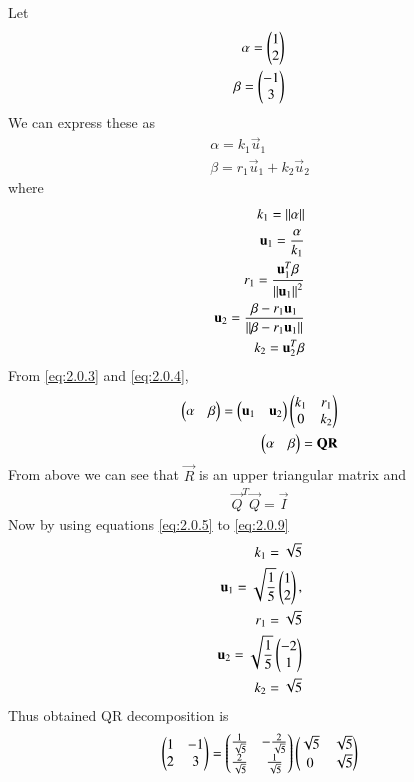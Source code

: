   Let 
  \begin{align}
\alpha=\begin{pmatrix}1\\2\end{pmatrix}\\
\beta=\begin{pmatrix}-1\\3\end{pmatrix}
\end{align}
We can express these as
\begin{align}
\alpha=k_1\vec{u}_1\label{eq:2.0.3}\\
\beta=r_1\vec{u}_1+k_2\vec{u}_2\label{eq:2.0.4}
\end{align}
where 
\begin{align}
k_1 = \left\lVert\alpha\right\rVert\label{eq:2.0.5}\\\mathbf{u}_1 = \frac{\mathbf{\alpha}}{k_1} 
\\
r_1 = \frac{\mathbf{u}_1^T\beta}{\left\lVert\mathbf{u}_1\right\rVert^2}\\
\mathbf{u}_2 = \frac{\beta - r_1 \mathbf{u}_1}{\left\lVert\beta - r_1 \mathbf{u}_1\right\rVert}
\\
k_2 = {\mathbf{u}_2^T\beta}\label{eq:2.0.9}
\end{align}
From \eqref{eq:2.0.3} and \eqref{eq:2.0.4}, 
\begin{align}
\begin{pmatrix}\alpha & \beta \end{pmatrix} = \begin{pmatrix}\mathbf{u}_1 & \mathbf{u}_2\end{pmatrix}\begin{pmatrix}k_1 & r_1 \\ 0 & k_2\end{pmatrix} \\
\begin{pmatrix}\alpha & \beta \end{pmatrix} = \mathbf{Q}\mathbf{R}
\end{align}
From above we can see that $\vec{R}$ is an upper triangular matrix and
\begin{align}
\vec{Q}^T\vec{Q}=\vec{I}
\end{align}
Now by using equations \eqref{eq:2.0.5} to \eqref{eq:2.0.9} 
\begin{align}
k_1 = \sqrt{5}\\ \mathbf{u}_1 = \sqrt{\frac{1}{5}} \begin{pmatrix}1\\2\end{pmatrix},
\\
r_1 = \sqrt{5}\\ \mathbf{u}_2 = \sqrt{\frac{1}{5}}\begin{pmatrix}-2\\1\end{pmatrix}
\\
k_2 = \sqrt{5}
\end{align}
Thus obtained QR decomposition is
\begin{align}
\begin{pmatrix}1&-1\\2&3\end{pmatrix}=\begin{pmatrix}\frac{1}{\sqrt{5}}& -\frac{2}{\sqrt{5}}\\\frac{2}{\sqrt{5}}& \frac{1}{\sqrt{5}}\end{pmatrix}\begin{pmatrix}\sqrt{5}&\sqrt{5}\\0&\sqrt{5}\end{pmatrix}
\end{align}
